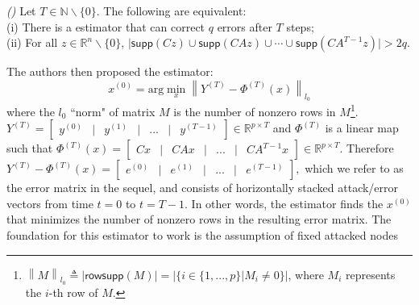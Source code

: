 \documentclass[../../thesis.tex]{subfiles}
\newcommand{\norm}[1]{\left\lVert#1\right\rVert}
\begin{document}
\begin{proposition}  \emph{(\hspace{1sp}\cite{Fawzi:2014})}  \label{prop:Fawzi} 
Let $T \in \mathbb{N}  \backslash \{ 0\}$. The following are equivalent:\\
(i) There is a estimator that can correct $q$ errors after $T$ steps;\\
(ii) For all $z\in \mathbb{R}^n \backslash \{0\}$, $\lvert \textsf{supp}(Cz) \cup \textsf{supp}(CAz) \cup \cdots \cup \textsf{supp}(CA^{T-1} z) \rvert > 2q$.
\end{proposition}
\noindent The authors then proposed the estimator:
\begin{equation}
x^{(0)} = \text{arg} \min_{x} \norm { Y^{(T)} - \Phi ^{(T)} (x) }_{l_0} 
\label{eq:opt_decoder}
\end{equation}
where the $l_0$ ``norm" of matrix $M$ is the number of nonzero rows in $M$\footnote{$\norm{M} _{l_0} \triangleq \lvert \textsf{rowsupp} (M) \rvert = \lvert \{ i \in \{ 1, ... , p\} | M_i \neq 0 \}  \rvert$, where $M_i$ represents the $i$-th row of $M$.}. $Y^{(T)} = \begin{bmatrix} y^{(0)} & \lvert & y^{(1)} & \lvert  & ... & \lvert & y^{(T-1)} \end{bmatrix} \in \mathbb{R}^{p\times T}$ and $\Phi^{(T)}$ is a linear map such that $\Phi ^{(T)} (x) = \begin{bmatrix} Cx  & \lvert & CAx  & \lvert &  ... &  \lvert & CA^{T-1} x \end{bmatrix} \in \mathbb{R}^{p\times T}$. Therefore
$Y^{(T)} - \Phi ^{(T)} (x) =  \begin{bmatrix} e^{(0)}  & \lvert & e^{(1)} & \lvert &  ... &  \lvert & e^{(T-1)} \end{bmatrix},$
which we refer to as the error matrix in the sequel, and consists of horizontally stacked attack/error vectors from time $t=0$ to $t=T-1$.
In other words, the estimator finds the $x^{(0)}$ that minimizes the number of nonzero rows in the resulting error matrix. The foundation for this estimator to work is the assumption of fixed attacked nodes
\end{document}
